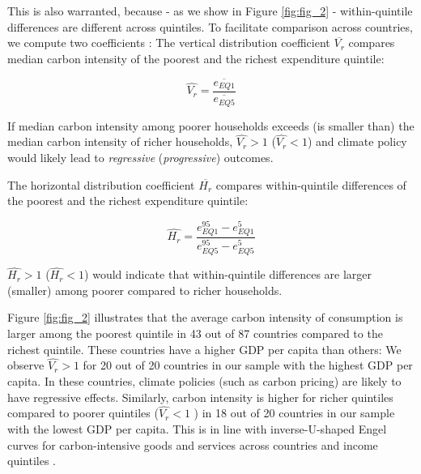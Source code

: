 \documentclass[12pt, a4paper]{article}
\begin{document}
This is also warranted, because - as we show in Figure \ref{fig:fig_2} - within-quintile differences are different across quintiles. To facilitate comparison across countries, we compute two coefficients \autocite{Missbach.2023b}: The vertical distribution coefficient $\overline{V_{r}}$ compares median carbon intensity of the poorest and the richest expenditure quintile:

\begin{equation}
    \widehat{V_{r}} = \frac{\overline{e_{EQ1}}}{\overline{e_{EQ5}}}
\end{equation}

If median carbon intensity among poorer households exceeds (is smaller than) the median carbon intensity of richer households, $\widehat{V_{r}}>1$ ($\widehat{V_{r}}<1$) and climate policy would likely lead to \textit{regressive} (\textit{progressive}) outcomes.

The horizontal distribution coefficient $\overline{H_{r}}$ compares within-quintile differences of the poorest and the richest expenditure quintile:

\begin{equation}
    \widehat{H_{r}} = \frac{e_{EQ1}^{95} - e_{EQ1}^{5}}{e_{EQ5}^{95} - e_{EQ5}^{5}}
\end{equation}

$\widehat{H_{r}}>1$ ($\widehat{H_{r}}<1$) would indicate that within-quintile differences are larger (smaller) among poorer compared to richer households.

Figure \ref{fig:fig_2} illustrates that the average carbon intensity of consumption is larger among the poorest quintile in 43 out of 87 countries compared to the richest quintile. These countries have a higher GDP per capita than others: We observe $\widehat{V_{r}}>1$ for 20 out of 20 countries in our sample with the highest GDP per capita. In these countries, climate policies (such as carbon pricing) are likely to have regressive effects. Similarly, carbon intensity is higher for richer quintiles compared to poorer quintiles ($\widehat{V_{r}}<1$ ) in 18 out of 20 countries in our sample with the lowest GDP per capita. This is in line with inverse-U-shaped Engel curves for carbon-intensive goods and services across countries and income quintiles \autocite{Dorband.2019}. %
\end{document}
